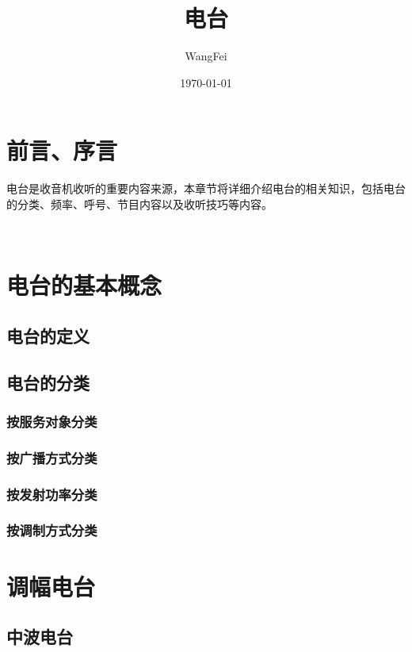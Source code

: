 \documentclass[12pt,UTF8]{ctexbook}
\title{\heiti\zihao{0} 电台}
\author{WangFei}
\date{\today}
\begin{document}
\maketitle
\tableofcontents

\frontmatter
\chapter{前言、序言}

电台是收音机收听的重要内容来源，本章节将详细介绍电台的相关知识，包括电台的分类、频率、呼号、节目内容以及收听技巧等内容。

\mainmatter

~\\

\chapter{电台的基本概念}

\section{电台的定义}

\section{电台的分类}

\subsection{按服务对象分类}

\subsection{按广播方式分类}

\subsection{按发射功率分类}

\subsection{按调制方式分类}

\chapter{调幅电台}

\section{中波电台}
\end{document}
